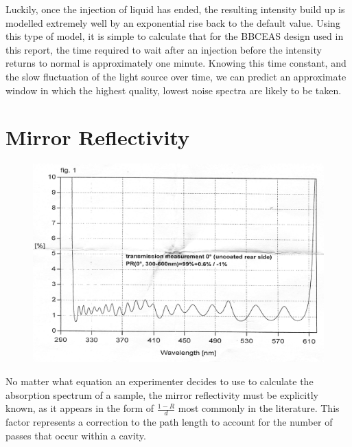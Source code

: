 Luckily, once the injection of liquid has ended, the resulting intensity build
up is modelled extremely well by an exponential rise back to the default
value. Using this type of model, it is simple to calculate that for the
\ac{BBCEAS} design used in this report, the time required to wait after an
injection before the intensity returns to normal is approximately one minute.
Knowing this time constant, and the slow fluctuation of the light source over
time, we can predict an approximate window in which the highest quality,
lowest noise spectra are likely to be taken.

\section{Mirror Reflectivity}\label{sec:mirror_considerations}

\begin{figure}
\begin{center}
\includegraphics[width=\textwidth]{figures/mirrors.jpg}
\end{center}
\caption{}
\label{fig:mirror}
\end{figure}

No matter what equation an experimenter decides to use to calculate the
absorption spectrum of a sample, the mirror reflectivity must be explicitly
known, as it appears in the form of $\tfrac{1-R}{d}$ most commonly in the
literature. This factor represents a correction to the path length to account
for the number of passes that occur within a cavity.

